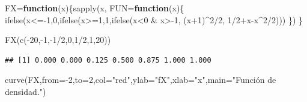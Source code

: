 \documentclass[
]{article}
\newenvironment{Shaded}{\begin{snugshade}}{\end{snugshade}}
\newcommand{\AttributeTok}[1]{\textcolor[rgb]{0.77,0.63,0.00}{#1}}
\newcommand{\ControlFlowTok}[1]{\textcolor[rgb]{0.13,0.29,0.53}{\textbf{#1}}}
\newcommand{\DecValTok}[1]{\textcolor[rgb]{0.00,0.00,0.81}{#1}}
\newcommand{\FunctionTok}[1]{\textcolor[rgb]{0.00,0.00,0.00}{#1}}
\newcommand{\NormalTok}[1]{#1}
\newcommand{\OtherTok}[1]{\textcolor[rgb]{0.56,0.35,0.01}{#1}}
\newcommand{\SpecialCharTok}[1]{\textcolor[rgb]{0.00,0.00,0.00}{#1}}
\newcommand{\StringTok}[1]{\textcolor[rgb]{0.31,0.60,0.02}{#1}}
\begin{document}
\begin{Shaded}
\begin{Highlighting}[]
\NormalTok{FX}\OtherTok{=}\ControlFlowTok{function}\NormalTok{(x)\{}\FunctionTok{sapply}\NormalTok{(x,}
                      \AttributeTok{FUN=}\ControlFlowTok{function}\NormalTok{(x)\{}
\FunctionTok{ifelse}\NormalTok{(x}\SpecialCharTok{\textless{}={-}}\DecValTok{1}\NormalTok{,}\DecValTok{0}\NormalTok{,}\FunctionTok{ifelse}\NormalTok{(x}\SpecialCharTok{\textgreater{}=}\DecValTok{1}\NormalTok{,}\DecValTok{1}\NormalTok{,}\FunctionTok{ifelse}\NormalTok{(x}\SpecialCharTok{\textless{}}\DecValTok{0} \SpecialCharTok{\&}\NormalTok{ x}\SpecialCharTok{\textgreater{}{-}}\DecValTok{1}\NormalTok{, (x}\SpecialCharTok{+}\DecValTok{1}\NormalTok{)}\SpecialCharTok{\^{}}\DecValTok{2}\SpecialCharTok{/}\DecValTok{2}\NormalTok{, }\DecValTok{1}\SpecialCharTok{/}\DecValTok{2}\SpecialCharTok{+}\NormalTok{x}\SpecialCharTok{{-}}\NormalTok{x}\SpecialCharTok{\^{}}\DecValTok{2}\SpecialCharTok{/}\DecValTok{2}\NormalTok{)))  }
\NormalTok{\})}
\NormalTok{\}}

                            
                          
\FunctionTok{FX}\NormalTok{(}\FunctionTok{c}\NormalTok{(}\SpecialCharTok{{-}}\DecValTok{20}\NormalTok{,}\SpecialCharTok{{-}}\DecValTok{1}\NormalTok{,}\SpecialCharTok{{-}}\DecValTok{1}\SpecialCharTok{/}\DecValTok{2}\NormalTok{,}\DecValTok{0}\NormalTok{,}\DecValTok{1}\SpecialCharTok{/}\DecValTok{2}\NormalTok{,}\DecValTok{1}\NormalTok{,}\DecValTok{20}\NormalTok{))}
\end{Highlighting}
\end{Shaded}

\begin{verbatim}
## [1] 0.000 0.000 0.125 0.500 0.875 1.000 1.000
\end{verbatim}

\begin{Shaded}
\begin{Highlighting}[]
\FunctionTok{curve}\NormalTok{(FX,}\AttributeTok{from=}\SpecialCharTok{{-}}\DecValTok{2}\NormalTok{,}\AttributeTok{to=}\DecValTok{2}\NormalTok{,}\AttributeTok{col=}\StringTok{"red"}\NormalTok{,}\AttributeTok{ylab=}\StringTok{"fX"}\NormalTok{,}\AttributeTok{xlab=}\StringTok{"x"}\NormalTok{,}\AttributeTok{main=}\StringTok{"Función de densidad."}\NormalTok{)}
\end{Highlighting}
\end{Shaded}
\end{document}
